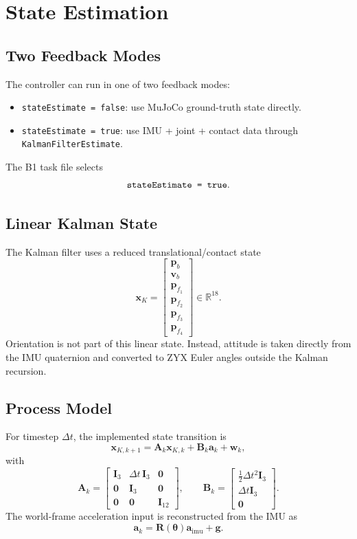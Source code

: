 \documentclass[11pt,a4paper]{article}
\newcommand{\R}{\mathbb{R}}
\newcommand{\vect}[1]{\bm{#1}}
\newcommand{\mat}[1]{\bm{#1}}
\newcommand{\code}[1]{\texttt{#1}}
\begin{document}
\section{State Estimation}
\subsection{Two Feedback Modes}
The controller can run in one of two feedback modes:
\begin{itemize}[leftmargin=*]
\item \code{stateEstimate = false}: use MuJoCo ground-truth state directly.
\item \code{stateEstimate = true}: use IMU + joint + contact data through \code{KalmanFilterEstimate}.
\end{itemize}
The B1 task file selects
\[
\text{\texttt{stateEstimate = true}}.
\]

\subsection{Linear Kalman State}
The Kalman filter uses a reduced translational/contact state
\begin{equation}
\vect{x}_K =
\begin{bmatrix}
\vect{p}_b \\
\vect{v}_b \\
\vect{p}_{f_1} \\
\vect{p}_{f_2} \\
\vect{p}_{f_3} \\
\vect{p}_{f_4}
\end{bmatrix}
\in \R^{18}.
\end{equation}
Orientation is not part of this linear state. Instead, attitude is taken directly from the IMU quaternion and converted to ZYX Euler angles outside the Kalman recursion.

\subsection{Process Model}
For timestep \(\Delta t\), the implemented state transition is
\begin{equation}
\vect{x}_{K,k+1} = \mat{A}_k \vect{x}_{K,k} + \mat{B}_k \vect{a}_k + \vect{w}_k,
\end{equation}
with
\begin{equation}
\mat{A}_k =
\begin{bmatrix}
\mat{I}_3 & \Delta t\,\mat{I}_3 & \mat{0} \\
\mat{0} & \mat{I}_3 & \mat{0} \\
\mat{0} & \mat{0} & \mat{I}_{12}
\end{bmatrix},
\qquad
\mat{B}_k =
\begin{bmatrix}
\frac{1}{2}\Delta t^2 \mat{I}_3 \\
\Delta t \mat{I}_3 \\
\mat{0}
\end{bmatrix}.
\end{equation}
The world-frame acceleration input is reconstructed from the IMU as
\begin{equation}
\vect{a}_k = \mat{R}(\vect{\theta}) \vect{a}_{\mathrm{imu}} + \vect{g}.
\end{equation}
\end{document}
